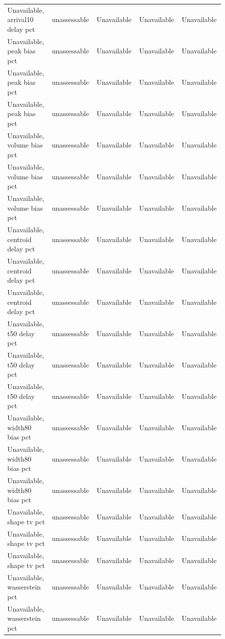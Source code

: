 \begin{longtable}{p{0.1760\linewidth}p{0.1760\linewidth}p{0.1760\linewidth}p{0.1760\linewidth}p{0.1760\linewidth}}
Unavailable, arrival10 delay pct & unassessable & Unavailable & Unavailable & Unavailable \\
Unavailable, peak bias pct & unassessable & Unavailable & Unavailable & Unavailable \\
Unavailable, peak bias pct & unassessable & Unavailable & Unavailable & Unavailable \\
Unavailable, peak bias pct & unassessable & Unavailable & Unavailable & Unavailable \\
Unavailable, volume bias pct & unassessable & Unavailable & Unavailable & Unavailable \\
Unavailable, volume bias pct & unassessable & Unavailable & Unavailable & Unavailable \\
Unavailable, volume bias pct & unassessable & Unavailable & Unavailable & Unavailable \\
Unavailable, centroid delay pct & unassessable & Unavailable & Unavailable & Unavailable \\
Unavailable, centroid delay pct & unassessable & Unavailable & Unavailable & Unavailable \\
Unavailable, centroid delay pct & unassessable & Unavailable & Unavailable & Unavailable \\
Unavailable, t50 delay pct & unassessable & Unavailable & Unavailable & Unavailable \\
Unavailable, t50 delay pct & unassessable & Unavailable & Unavailable & Unavailable \\
Unavailable, t50 delay pct & unassessable & Unavailable & Unavailable & Unavailable \\
Unavailable, width80 bias pct & unassessable & Unavailable & Unavailable & Unavailable \\
Unavailable, width80 bias pct & unassessable & Unavailable & Unavailable & Unavailable \\
Unavailable, width80 bias pct & unassessable & Unavailable & Unavailable & Unavailable \\
Unavailable, shape tv pct & unassessable & Unavailable & Unavailable & Unavailable \\
Unavailable, shape tv pct & unassessable & Unavailable & Unavailable & Unavailable \\
Unavailable, shape tv pct & unassessable & Unavailable & Unavailable & Unavailable \\
Unavailable, wasserstein pct & unassessable & Unavailable & Unavailable & Unavailable \\
Unavailable, wasserstein pct & unassessable & Unavailable & Unavailable & Unavailable \\

\end{longtable}
